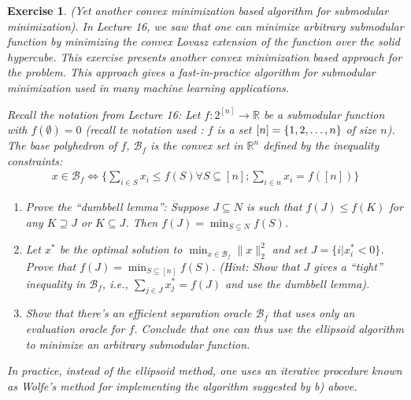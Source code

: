 \documentclass[12pt]{article}
\theoremstyle{colon}
\newtheorem{exercise}{Exercise}
\begin{document}
\begin{exercise}
  (Yet another convex minimization based algorithm for submodular minimization). In Lecture 16, we saw that one can minimize arbitrary submodular function by minimizing the convex Lovasz extension of the function over the solid hypercube. This exercise presents another convex minimization based approach for the problem. This approach gives a fast-in-practice algorithm for submodular minimization used in many machine learning applications.

  Recall the notation from Lecture 16: Let $f: 2^{[n]} \rightarrow \mathbb{R}$ be a submodular function with $f(\emptyset) = 0$ (recall te notation used : $f$ is a \textit{set} $[n] = \{1,2,\mathellipsis, n\}$ of size $n$). The base polyhedron of $f$, $\mathcal{B}_f$ is the convex set in $\mathbb{R}^n$ defined by the inequality constraints:
  \begin{gather*}
    x \in \mathcal{B}_f \Leftrightarrow \{ \sum_{i \in S} x_i \leq f(S) \forall S \subseteq [n]; \sum_{i \in n} x_i = f([n]) \}
  \end{gather*}

  \begin{enumerate}[label=\alph*)]
    \item Prove the ``dumbbell lemma'': Suppose $J \subseteq N$ is such that $f(J) \leq f(K)$ for any $K \supseteq J$ or $K \subseteq J$. Then $f(J) = \min_{S \subseteq N} f(S)$.
    \item Let $x^*$ be the optimal solution to $\min_{x \in \mathcal{B}_f} \lVert x \rVert_2^2$ and set $J = \{ i | x_i^* < 0 \}$. Prove that $f(J) = \min_{S \subseteq [n]} f(S)$. (Hint: Show that $J$ gives a ``tight'' inequality in $\mathcal{B}_f$, i.e., $\sum_{j \in J} x_j^* = f(J)$ and use the dumbbell lemma).
    \item Show that there's an efficient separation oracle $\mathcal{B}_f$ that uses only an evaluation oracle for $f$. Conclude that one can thus use the ellipsoid algorithm to minimize an arbitrary submodular function.
  \end{enumerate}

  In practice, instead of the ellipsoid method, one uses an iterative procedure known as \textit{Wolfe's method} for implementing the algorithm suggested by b) above.
\end{exercise}
\end{document}
